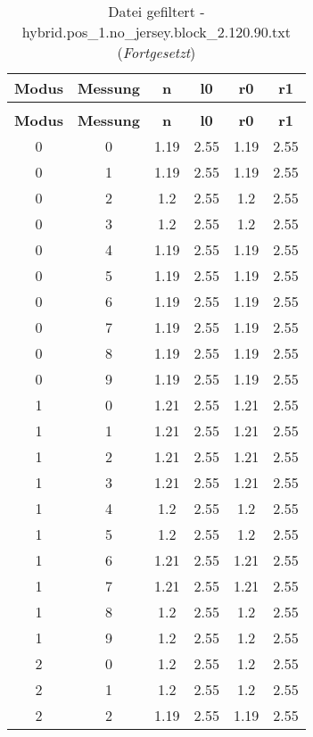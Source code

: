 \begin{longtable}{|c|c||c||c||c|c|}
	\caption{Datei gefiltert - hybrid.pos\_1.no\_jersey.block\_2.120.90.txt} \label{tab:hybrid.pos-1.no-jersey.block-2.120.90.txt} \\ \hline
	\textbf{Modus} & \textbf{Messung} & \textbf{n} & \textbf{l0} & \textbf{r0} & \textbf{r1}\\ \hline
	\endfirsthead
	\caption[]{Datei gefiltert - hybrid.pos\_1.no\_jersey.block\_2.120.90.txt (\emph{Fortgesetzt})} \\ \hline
	\textbf{Modus} & \textbf{Messung} & \textbf{n} & \textbf{l0} & \textbf{r0} & \textbf{r1}\\ \hline
	\endhead
	0 & 0 & 1.19 & 2.55 & 1.19 & 2.55 \\ \hline
	0 & 1 & 1.19 & 2.55 & 1.19 & 2.55 \\ \hline
	0 & 2 & 1.2 & 2.55 & 1.2 & 2.55 \\ \hline
	0 & 3 & 1.2 & 2.55 & 1.2 & 2.55 \\ \hline
	0 & 4 & 1.19 & 2.55 & 1.19 & 2.55 \\ \hline
	0 & 5 & 1.19 & 2.55 & 1.19 & 2.55 \\ \hline
	0 & 6 & 1.19 & 2.55 & 1.19 & 2.55 \\ \hline
	0 & 7 & 1.19 & 2.55 & 1.19 & 2.55 \\ \hline
	0 & 8 & 1.19 & 2.55 & 1.19 & 2.55 \\ \hline
	0 & 9 & 1.19 & 2.55 & 1.19 & 2.55 \\ \hline
	1 & 0 & 1.21 & 2.55 & 1.21 & 2.55 \\ \hline
	1 & 1 & 1.21 & 2.55 & 1.21 & 2.55 \\ \hline
	1 & 2 & 1.21 & 2.55 & 1.21 & 2.55 \\ \hline
	1 & 3 & 1.21 & 2.55 & 1.21 & 2.55 \\ \hline
	1 & 4 & 1.2 & 2.55 & 1.2 & 2.55 \\ \hline
	1 & 5 & 1.2 & 2.55 & 1.2 & 2.55 \\ \hline
	1 & 6 & 1.21 & 2.55 & 1.21 & 2.55 \\ \hline
	1 & 7 & 1.21 & 2.55 & 1.21 & 2.55 \\ \hline
	1 & 8 & 1.2 & 2.55 & 1.2 & 2.55 \\ \hline
	1 & 9 & 1.2 & 2.55 & 1.2 & 2.55 \\ \hline
	2 & 0 & 1.2 & 2.55 & 1.2 & 2.55 \\ \hline
	2 & 1 & 1.2 & 2.55 & 1.2 & 2.55 \\ \hline
	2 & 2 & 1.19 & 2.55 & 1.19 & 2.55 \\ \hline

\end{longtable}
